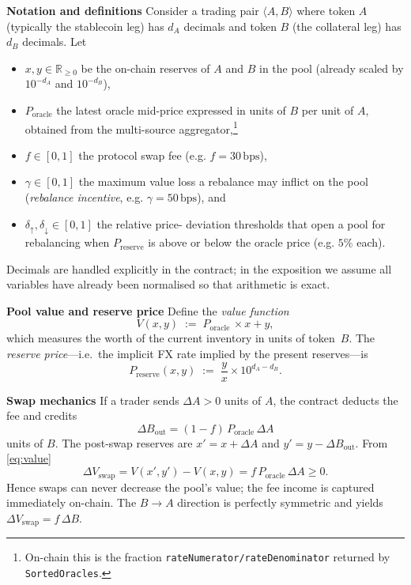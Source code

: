 \documentclass[a4paper]{article}
\providecommand{\hyp}{-}
\theoremstyle{definition}
\begin{document}
\noindent\textbf{Notation and definitions}\label{sec:fpmm_notation}
Consider a trading pair $\langle A,B\rangle$ where token $A$ (typically the
stablecoin leg) has $d_A$ decimals and token $B$ (the collateral leg) has
$d_B$ decimals.  Let
\begin{itemize}[leftmargin=*]
  \item $x,y\in\mathbb{R}_{\ge 0}$ be the on\hyp chain reserves of $A$ and $B$ in
        the pool (already scaled by $10^{-d_A}$ and $10^{-d_B}$),
  \item $P_{\mathrm{oracle}}$ the latest oracle mid\hyp price expressed in units
        of $B$ per unit of $A$, obtained from the multi\hyp source aggregator,\footnote{On\hyp chain this is the fraction \texttt{rateNumerator/rateDenominator} returned by \texttt{SortedOracles}.}
  \item $f\in[0,1]$ the protocol swap fee (e.g. $f=30\,\text{bps}$),
  \item $\gamma\in[0,1]$ the maximum value loss a rebalance may inflict on the
        pool (\emph{rebalance incentive}, e.g. $\gamma=50\,\text{bps}$), and
  \item $\delta_{\uparrow},\delta_{\downarrow}\in[0,1]$ the relative price\hyp
        deviation thresholds that open a pool for rebalancing when
        $P_{\mathrm{reserve}}$ is above or below the oracle price (e.g. $5\%$ each).
\end{itemize}
Decimals are handled explicitly in the contract; in the exposition we assume all variables have already
been normalised so that arithmetic is exact.

\medskip\noindent\textbf{Pool value and reserve price}
Define the \emph{value function}
\begin{equation}
  V(x,y) \;:=\; P_{\mathrm{oracle}}\,\times x + y,\label{eq:value}
\end{equation}
which measures the worth of the current inventory in units of token~$B$.
The \emph{reserve price}—i.e.\ the implicit FX rate implied by the present
reserves—is
\begin{equation}
  P_{\mathrm{reserve}}(x,y) \;:=\; \frac{y}{x}\times 10^{d_A-d_B}.\label{eq:preserve}
\end{equation}


\medskip\noindent\textbf{Swap mechanics}
If a trader sends $\Delta A>0$ units of $A$, the contract deducts the fee and
credits
\begin{equation}
  \Delta B_{\text{out}} = (1-f)\,P_{\mathrm{oracle}}\,\Delta A\label{eq:swap_a_to_b}
\end{equation}
units of $B$.  The post\hyp swap reserves are
$x' = x + \Delta A$ and $y' = y - \Delta B_{\text{out}}$.  From
\eqref{eq:value}
\[
  \Delta V_{\text{swap}} = V(x',y')-V(x,y) = f\,P_{\mathrm{oracle}}\,\Delta A \ge 0.
\]
Hence swaps can never decrease the pool's value; the fee income is captured
immediately on\hyp chain.  The $B\!\rightarrow\!A$ direction is perfectly
symmetric and yields $\Delta V_{\text{swap}} = f\,\Delta B$.
\end{document}
